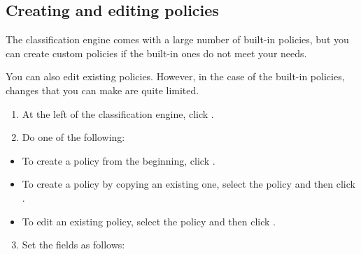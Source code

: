\documentclass[letterpaper,10pt,english]{sphinxmanual}
\begin{document}
\subsection{Creating and editing policies}
\label{\detokenize{mcdmp_app_ug:creating-and-editing-policies}}
The classification engine comes with a large number of built-in policies, but you can create custom policies if the built-in ones do not meet your needs.

You can also edit existing policies. However, in the case of the built-in policies, changes that you can make are quite limited.

\begin{enumerate}
\item {} 
At the left of the classification engine, click .

\item {} 
Do one of the following:

\end{enumerate}
\begin{itemize}
\item {} 
To create a policy from the beginning, click .

\item {} 
To create a policy by copying an existing one, select the policy and then click .

\item {} 
To edit an existing policy, select the policy and then click .

\end{itemize}
\begin{enumerate}
\setcounter{enumi}{2}
\item {} 
Set the fields as follows:

\end{enumerate}
\end{document}
